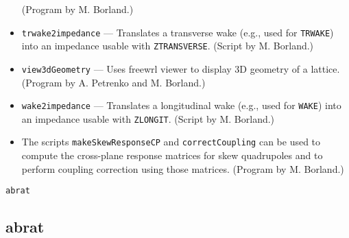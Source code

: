 \documentclass[11pt]{article}
\begin{document}
\begin{itemize}
  (Program by M. Borland.)
\item {\tt trwake2impedance} --- Translates a transverse wake (e.g., used for \verb|TRWAKE|) into an impedance usable with
  \verb|ZTRANSVERSE|. (Script by M. Borland.)
\item {\tt view3dGeometry} --- Uses freewrl viewer to display 3D geometry of a lattice. 
  (Program by A. Petrenko and M. Borland.)
\item {\tt wake2impedance} --- Translates a longitudinal wake (e.g., used for \verb|WAKE|) into an impedance usable with
  \verb|ZLONGIT|. (Script by M. Borland.)
\item The scripts \verb|makeSkewResponseCP| and \verb|correctCoupling| can be used to compute the cross-plane response
  matrices for skew quadrupoles and to perform coupling correction using those matrices.
  (Program by M. Borland.)
\end{itemize}

\newpage
\begin{center}{\Large\verb|abrat|}\end{center}
\subsection{abrat}
\end{document}
